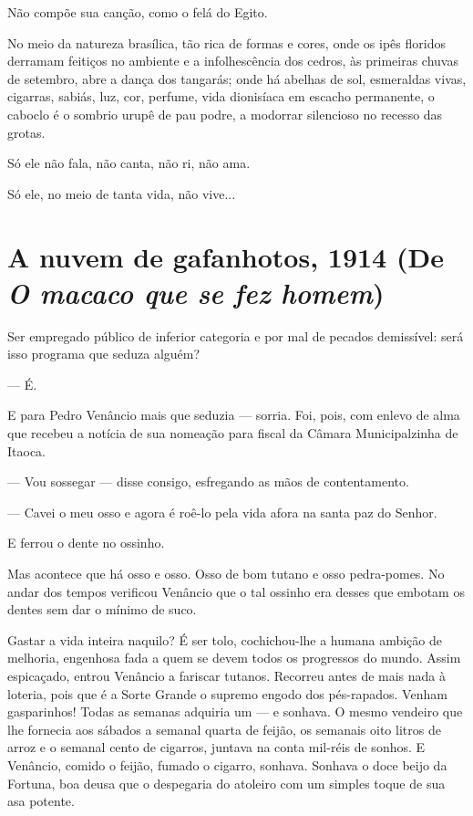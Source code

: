 Não compõe sua canção, como o felá do Egito.

No meio da natureza brasílica, tão rica de formas e cores, onde os ipês
floridos derramam feitiços no ambiente e a infolhescência dos cedros, às
primeiras chuvas de setembro, abre a dança dos tangarás; onde há abelhas
de sol, esmeraldas vivas, cigarras, sabiás, luz, cor, perfume, vida
dionisíaca em escacho permanente, o caboclo é o sombrio urupê de pau
podre, a modorrar silencioso no recesso das grotas.

Só ele não fala, não canta, não ri, não ama.

Só ele, no meio de tanta vida, não vive...

\chapter{A nuvem de gafanhotos, 1914 (De \emph{O macaco que se fez homem})}

Ser empregado público de inferior categoria e por mal de pecados
demissível: será isso programa que seduza alguém?

--- É.

E para Pedro Venâncio mais que seduzia --- sorria. Foi, pois, com enlevo
de alma que recebeu a notícia de sua nomeação para fiscal da Câmara
Municipalzinha de Itaoca.

--- Vou sossegar --- disse consigo, esfregando as mãos de contentamento.

--- Cavei o meu osso e agora é roê-lo pela vida afora na santa paz do
Senhor.

E ferrou o dente no ossinho.

Mas acontece que há osso e osso. Osso de bom tutano e osso pedra-pomes.
No andar dos tempos verificou Venâncio que o tal ossinho era desses que
embotam os dentes sem dar o mínimo de suco.

Gastar a vida inteira naquilo? É ser tolo, cochichou-lhe a humana
ambição de melhoria, engenhosa fada a quem se devem todos os progressos
do mundo. Assim espicaçado, entrou Venâncio a fariscar tutanos. Recorreu
antes de mais nada à loteria, pois que é a Sorte Grande o supremo engodo
dos pés-rapados. Venham gasparinhos! Todas as semanas adquiria um --- e
sonhava. O mesmo vendeiro que lhe fornecia aos sábados a semanal quarta
de feijão, os semanais oito litros de arroz e o semanal cento de
cigarros, juntava na conta mil-réis de sonhos. E Venâncio, comido o
feijão, fumado o cigarro, sonhava. Sonhava o doce beijo da Fortuna, boa
deusa que o despegaria do atoleiro com um simples toque de sua asa
potente.


